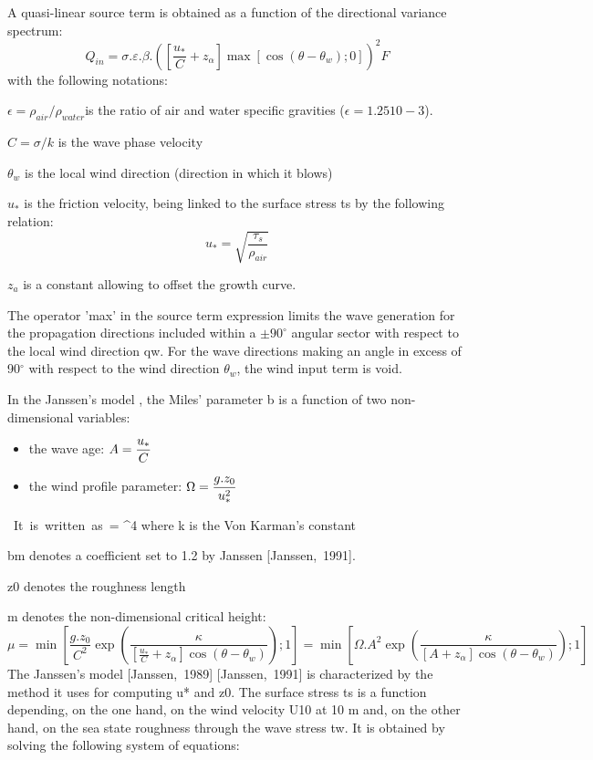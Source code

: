  A quasi-linear source term is obtained as a function of the directional variance spectrum:
\begin{equation} \label{GrindEQ__4_27_}
Q_{in} =\sigma .\varepsilon .\beta .\left(\left[\frac{u_{*} }{C} +z_{\alpha } \right]\max \left[\cos (\theta -\theta _{w} );0\right]\right)^{2} F
\end{equation}
with the following notations:

$ \epsilon = \rho_{air}/\rho_{water }$is the ratio of air and water specific gravities ($ \epsilon = 1.25 10-3$).

 $C = \sigma/k$ is the wave phase velocity

 $\theta_w$ is the local wind direction (direction in which it blows)

 $u_*$ is the friction velocity, being linked to the surface stress ts by the following relation:
\begin{equation} \label{GrindEQ__4_28_}
u_{*} =\sqrt{\frac{\tau _{s} }{\rho _{air} } }
\end{equation}

 $z_a$ is a constant allowing to offset the growth curve.

 The operator 'max' in the source term expression limits the wave generation for the propagation directions included within a $\pm 90^\circ$ angular sector with respect to the local wind direction qw. For the wave directions making an angle in excess of 90${}^\circ$ with respect to the wind direction $\theta_w$, the wind input term is void.

 In the Janssen's model \cite{Janssen1991}, the Miles' parameter b is a function of two non-dimensional variables:

\begin{itemize}
\item  the wave age:  $\displaystyle A=\frac{u_{*} }{C} $
\item  the wind profile parameter: $\displaystyle \Omega =\frac{g.z_{0} }{u_{*}^{2} } $
\end{itemize}
\bequ
\label{GrindEQ__4_29_}
\mbox{ It is written as }\beta = \mu \ln ^{4} \mu 
\eequ
 where k is the Von Karman's constant

 bm denotes a coefficient set to 1.2 by Janssen [Janssen,~1991].

 z0 denotes the roughness length

 m denotes the non-dimensional critical height:
\begin{equation} \label{GrindEQ__4_30_}
\mu =\min \left[\frac{g.z_{0} }{C^{2} } \exp \left(\frac{\kappa }{\left[\frac{u_{*} }{C} +z_{\alpha } \right]\cos (\theta -\theta _{w} )} \right);1\right]=\min \left[\Omega .A^{2} \exp \left(\frac{\kappa }{\left[A+z_{\alpha } \right]\cos (\theta -\theta _{w} )} \right);1\right]
\end{equation}
The Janssen's model [Janssen,~1989] [Janssen,~1991] is characterized by the method it uses for computing u* and z0. The surface stress ts is a function depending, on the one hand, on the wind velocity U10 at 10 m and, on the other hand, on the sea state roughness through the wave stress tw. It is obtained by solving the following system of equations:

